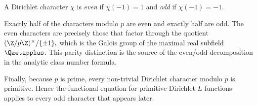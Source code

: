 \begin{definition}\label{def:even-odd}
  \leanok
A Dirichlet character $\chi$ is \emph{even} if $\chi(-1)=1$ and \emph{odd}
if $\chi(-1)=-1$.
\end{definition}

Exactly half of the characters modulo $p$ are even and exactly half are odd.
The even characters are precisely those that factor through the quotient
\(
  (\Z/p\Z)^\times / \{\pm 1\},
\)
which is the Galois group of the maximal real subfield $\Qzetapplus$.
This parity distinction is the source of the even/odd decomposition in the
analytic class number formula.

Finally, because $p$ is prime, every non-trivial Dirichlet character modulo
$p$ is primitive. Hence the functional equation for primitive Dirichlet
$L$-functions applies to every odd character that appears later.
